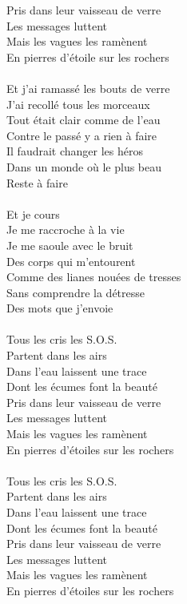 Pris dans leur vaisseau de verre\\
Les messages luttent\\
Mais les vagues les ramènent\\
En pierres d'étoile sur les rochers\\\\
Et j'ai ramassé les bouts de verre\\
J'ai recollé tous les morceaux\\
Tout était clair comme de l'eau\\
Contre le passé y a rien à faire\\
Il faudrait changer les héros\\
Dans un monde où le plus beau\\
Reste à faire\\\\
Et je cours\\
Je me raccroche à la vie\\
Je me saoule avec le bruit\\
Des corps qui m'entourent\\
Comme des lianes nouées de tresses\\
Sans comprendre la détresse\\
Des mots que j'envoie\\\\
Tous les cris les S.O.S.\\
Partent dans les airs\\
Dans l'eau laissent une trace\\
Dont les écumes font la beauté\\
Pris dans leur vaisseau de verre\\
Les messages luttent\\
Mais les vagues les ramènent\\
En pierres d'étoiles sur les rochers\\\\
Tous les cris les S.O.S.\\
Partent dans les airs\\
Dans l'eau laissent une trace\\
Dont les écumes font la beauté\\
Pris dans leur vaisseau de verre\\
Les messages luttent\\
Mais les vagues les ramènent\\
En pierres d'étoiles sur les rochers\\